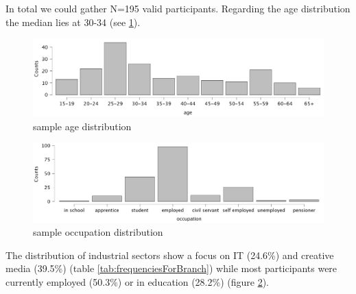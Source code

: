 \documentclass[
  a4paper,  %
  twoside,  %
  bibliography=totoc,
  headsepline,
  cleardoublepage=empty,
  parskip=half,
  draft=false
]{scrbook}
\begin{document}
In total we could gather N=195 valid participants. Regarding the age distribution the median lies at 30-34 (see \ref{fig:age-distribution}).
\begin{figure}[h]
  \centering
  \includegraphics[width=1\textwidth]{graphics/images/statistics/age-plot.png}
  \caption{sample age distribution}
  \label{fig:age-distribution}
\end{figure}
\begin{figure}[h]
  \centering
  \includegraphics[width=1\textwidth]{graphics/images/statistics/occupation.png}
  \caption{sample occupation distribution}
  \label{fig:occupation-plot}
\end{figure}
The distribution of industrial sectors show a focus on IT (24.6\%) and creative media (39.5\%) (table \ref{tab:frequenciesForBranch}) while most participants were currently employed (50.3\%) or in education (28.2\%) (figure \ref{fig:occupation-plot}). 
\end{document}
